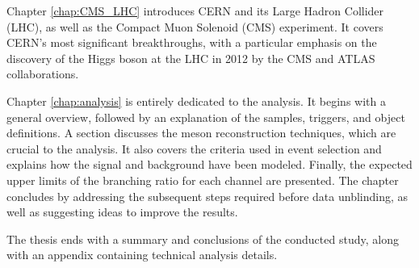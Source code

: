 Chapter \ref{chap:CMS_LHC} introduces CERN and its Large Hadron Collider (LHC), as well as the Compact Muon Solenoid (CMS) experiment. It covers CERN's most significant breakthroughs, with a particular emphasis on the discovery of the Higgs boson at the LHC in 2012 by the CMS and ATLAS collaborations.

Chapter \ref{chap:analysis} is entirely dedicated to the analysis. It begins with a general overview, followed by an explanation of the samples, triggers, and object definitions. A section discusses the meson reconstruction techniques, which are crucial to the analysis. It also covers the criteria used in event selection and explains how the signal and background have been modeled. Finally, the expected upper limits of the branching ratio for each channel are presented. The chapter concludes by addressing the subsequent steps required before data unblinding, as well as suggesting ideas to improve the results.

The thesis ends with a summary and conclusions of the conducted study, along with an appendix containing technical analysis details.
